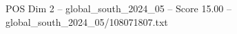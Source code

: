 \begin{textsample}{POS Dim 2 – global\_south\_2024\_05 – Score 15.00 – global\_south\_2024\_05/108071807.txt}
\end{textsample}
